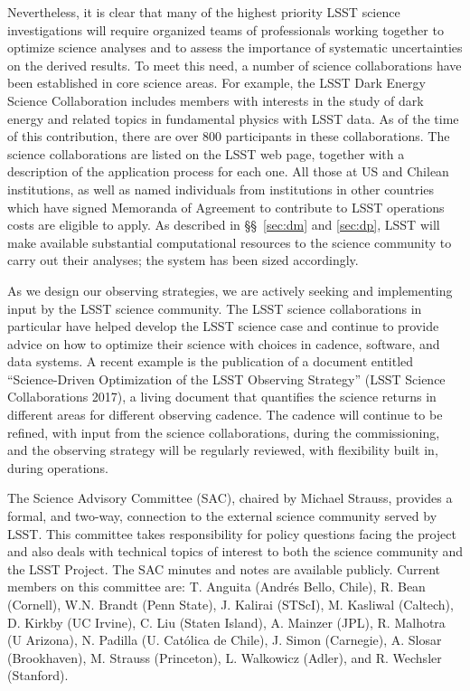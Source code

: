 Nevertheless, it is clear that many of the highest priority LSST science
investigations will require organized teams of professionals working together
to optimize science analyses and to assess the importance of systematic 
uncertainties on the derived results. To meet this need, a number of science
collaborations have been established in core science
areas. For example, the LSST Dark Energy Science Collaboration includes
members with interests in the study of dark energy and related topics in 
fundamental physics with LSST data. As of the time of this contribution, there are 
over 800 participants in these collaborations. %
The science collaborations are listed on the LSST web page, together
with a description of the application process for each one.  
All those at US and Chilean institutions,
as well as named individuals from institutions in other countries
which have signed Memoranda of Agreement to contribute to LSST
operations costs are eligible to apply. As described in
\S\S~\ref{sec:dm} and \ref{sec:dp}, LSST will make available
substantial computational resources to the
science community to carry out their analyses; 
the system has been sized accordingly. 

As we design our observing strategies, we are actively seeking and implementing
input by the LSST science community.  The LSST science collaborations
in particular have helped develop the LSST science case and continue
to provide advice on how to optimize their science with choices in
cadence, software,  
and data systems. A recent example is the publication of a document
entitled ``Science-Driven Optimization of the LSST Observing
Strategy'' (LSST Science Collaborations 2017), a living document that
quantifies the science returns in different areas for different
observing cadence.  The cadence will continue to be refined, with
input from the science collaborations, during the commissioning, and
the observing strategy will be regularly reviewed, with flexibility
built in, during operations.  

The Science Advisory Committee (SAC), chaired by Michael Strauss,
provides a formal, and two-way, connection to the external science
community served by LSST. This committee takes responsibility for
policy questions facing the project and also deals with technical
topics of interest to both the science community and the LSST
Project. The SAC minutes and notes are available
publicly. Current members on this committee are: T. Anguita (Andr\'es
Bello, Chile), R. Bean (Cornell), W.N. Brandt
(Penn State), J. Kalirai (STScI), M. Kasliwal
(Caltech), D. Kirkby (UC Irvine), C. Liu (Staten Island), A. Mainzer
(JPL), R. Malhotra (U Arizona),
N. Padilla (U. Cat\'olica de Chile), J. Simon (Carnegie), A. Slosar
(Brookhaven), M. Strauss (Princeton), L. Walkowicz (Adler),
and R. Wechsler (Stanford). 

